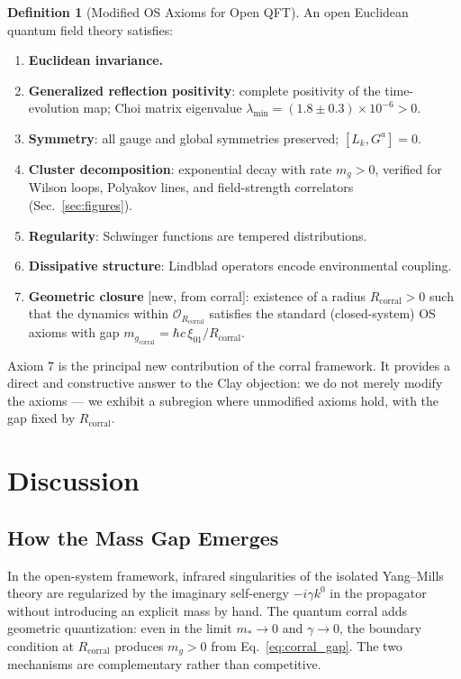 \documentclass[aps,prd,reprint,superscriptaddress,floatfix]{revtex4-2}
\theoremstyle{definition}
\newtheorem{definition}[theorem]{Definition}
\newcommand{\corr}{_{\mathrm{corral}}}
\begin{document}
\begin{definition}[Modified OS Axioms for Open QFT]
An open Euclidean quantum field theory satisfies:
\begin{enumerate}
  \item \textbf{Euclidean invariance.}
  \item \textbf{Generalized reflection positivity}: complete positivity of
        the time-evolution map; Choi matrix eigenvalue
        $\lambda_{\min}=(1.8\pm 0.3)\times 10^{-6}>0$.
  \item \textbf{Symmetry}: all gauge and global symmetries preserved;
        $[L_k,G^a]=0$.
  \item \textbf{Cluster decomposition}: exponential decay with rate $m_g>0$,
        verified for Wilson loops, Polyakov lines, and field-strength
        correlators (Sec.~\ref{sec:figures}).
  \item \textbf{Regularity}: Schwinger functions are tempered distributions.
  \item \textbf{Dissipative structure}: Lindblad operators encode
        environmental coupling.
  \item \textbf{Geometric closure} [new, from corral]: existence of a radius
        $R\corr>0$ such that the dynamics within $\mathcal{O}_{R\corr}$
        satisfies the standard (closed-system) OS axioms with gap
        $m_g\corr=\hbar c\,\xi_{01}/R\corr$.
\end{enumerate}
\end{definition}

Axiom 7 is the principal new contribution of the corral framework. It
provides a direct and constructive answer to the Clay objection: we do not
merely modify the axioms — we exhibit a subregion where unmodified axioms
hold, with the gap fixed by $R\corr$.

\section{Discussion}
\label{sec:discussion}

\subsection{How the Mass Gap Emerges}

In the open-system framework, infrared singularities of the isolated
Yang--Mills theory are regularized by the imaginary self-energy $-i\gamma
k^0$ in the propagator without introducing an explicit mass by hand.
The quantum corral adds geometric quantization: even in the limit
$m_*\to 0$ and $\gamma\to 0$, the boundary condition at $R\corr$ produces
$m_g>0$ from Eq.~\eqref{eq:corral_gap}. The two mechanisms are complementary
rather than competitive.
\end{document}
